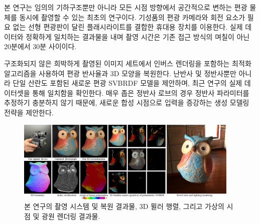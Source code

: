 \documentclass[a4paper,twocolumn]{article}
\begin{document}
본 연구는 임의의 기하구조뿐만 아니라 모든 시점 방향에서 공간적으로 변하는 편광 물체를 동시에 촬영할 수 있는 최초의 연구이다. 기성품의 편광 카메라와 회전 요소가 필요 없는 선형 편광판이 달린 플래시라이트를 결합한 휴대용 장치를 이용한다. 
실제 데이터와 정확하게 일치하는 결과물을 내며 촬영 시간은 기존 접근 방식의 며칠이 아닌 20분에서 30분 사이이다.

구조화되지 않은 희박하게 촬영된 이미지 세트에서 인버스 렌더링을 포함하는 최적화 알고리즘을 사용하여 편광 반사율과 3D 모양을 복원한다. 
난반사 및 정반사뿐만 아니라 단일 산란도 포함된 새로운 편광 SVBRDF 모델을 제안하며, 최근 연구의 실제 데이터셋을 통해 일치함을 확인한다.
매우 좁은 정반사 로브의 경우 정반사 파라미터를 추정하기 충분하지 않기 때문에, 새로운 합성 시점으로 입력을 증강하는 생성 모델링 전략을 제안한다.


\begin{figure}[tpb]
	\vspace{-2mm}%
	\centering%
	\footnotesize%
	\includegraphics[width=0.95\textwidth]{fig/teaser.pdf}%
	\vspace{-3mm}%
	\caption{본 연구의 촬영 시스템 및 복원 결과물, 3D 뮐러 행렬, 그리고 가상의 시점 및 광원 렌더링 결과물.}
	\label{fig:teaser}
	\vspace{-2mm}
\end{figure}
\end{document}
